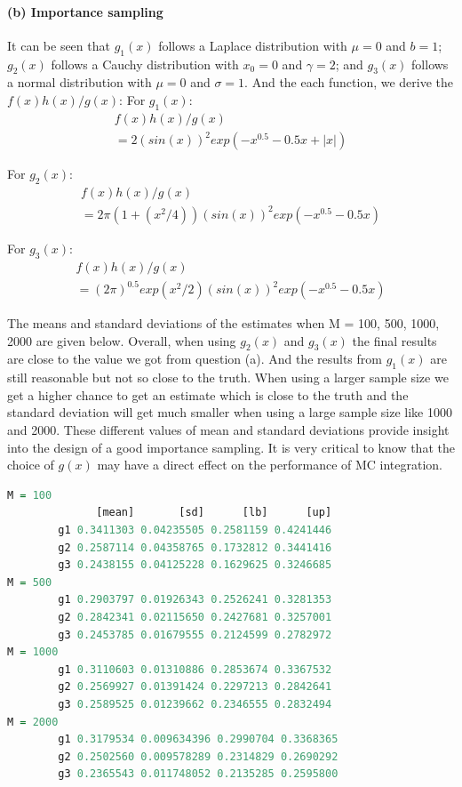 \documentclass[10pt, letterpaper]{proc}
\begin{document}
\paragraph{(b) Importance sampling} It can be seen that $g_1(x)$ follows a Laplace distribution with $\mu = 0$ and $b = 1$; $g_2(x)$ follows a Cauchy distribution with $x_0 = 0$ and $\gamma = 2 $; and $g_3(x)$ follows a normal distribution with $\mu = 0$ and $\sigma = 1$.
And the each function, we derive the $f(x)h(x)/g(x)$:
For  $g_1(x)$: 
\begin{equation}
\begin{aligned}
f(x)h(x)/g(x) \\= 2(sin(x))^2  exp (-x^{0.5} - 0.5x + |x|)
\end{aligned}
\end{equation}

For  $g_2(x)$: 
\begin{equation}
\begin{aligned}
f(x)h(x)/g(x) \\ = 2\pi(1+(x^2/4)) (sin(x))^2  exp (-x^{0.5} - 0.5x)
\end{aligned}
\end{equation}

For  $g_3(x)$: 
\begin{equation}
\begin{aligned}
f(x)h(x)/g(x) \\ = (2\pi)^{0.5}  exp(x^2/2) (sin(x))^2  exp (-x^{0.5} - 0.5x)
\end{aligned}
\end{equation}

The means and standard deviations of the estimates when M = 100, 500, 1000, 2000 are given below. Overall, when using $g_2(x)$ and $g_3(x)$ the final results are close to the value we got from question (a). And the results from $g_1(x)$ are still reasonable but not so close to the truth. When using a larger sample size we get a higher chance to get an estimate which is close to the truth and the standard deviation will get much smaller when using a large sample size like 1000 and 2000. These different values of mean and standard deviations provide insight into the design of a good importance sampling. It is very critical to know that the choice of $g(x)$ may have a direct effect on the performance of MC integration.

\begin{lstlisting}[language=R, breaklines=T, basicstyle=\tiny]
M = 100
              [mean]       [sd]      [lb]      [up]
        g1 0.3411303 0.04235505 0.2581159 0.4241446
        g2 0.2587114 0.04358765 0.1732812 0.3441416
        g3 0.2438155 0.04125228 0.1629625 0.3246685
M = 500        
        g1 0.2903797 0.01926343 0.2526241 0.3281353
        g2 0.2842341 0.02115650 0.2427681 0.3257001
        g3 0.2453785 0.01679555 0.2124599 0.2782972
M = 1000		
        g1 0.3110603 0.01310886 0.2853674 0.3367532
        g2 0.2569927 0.01391424 0.2297213 0.2842641
        g3 0.2589525 0.01239662 0.2346555 0.2832494
M = 2000
        g1 0.3179534 0.009634396 0.2990704 0.3368365
        g2 0.2502560 0.009578289 0.2314829 0.2690292
        g3 0.2365543 0.011748052 0.2135285 0.2595800
\end{lstlisting}
\end{document}
